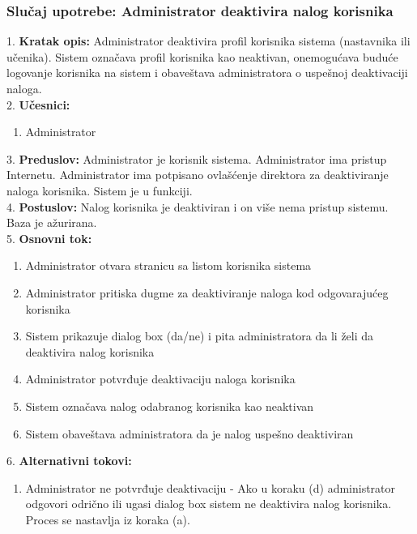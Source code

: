 \documentclass{article}
\begin{document}
\subsubsection{Slučaj upotrebe: Administrator deaktivira nalog korisnika}
1. \textbf{Kratak opis:} Administrator deaktivira profil korisnika sistema (nastavnika ili učenika). Sistem označava profil korisnika kao neaktivan, onemogućava buduće logovanje korisnika na sistem i obaveštava administratora o uspešnoj deaktivaciji naloga. \\

2. \textbf{Učesnici:}
\begin{enumerate} [label=(\alph*)]
\item Administrator
\end{enumerate} 

3. \textbf{Preduslov:} Administrator je korisnik sistema. Administrator ima pristup Internetu. Administrator ima potpisano ovlašćenje direktora za deaktiviranje naloga korisnika. Sistem je u funkciji. \\

4. \textbf{Postuslov:} Nalog korisnika je deaktiviran i on više nema pristup sistemu. Baza je ažurirana. \\

5. \textbf{Osnovni tok:} 
\begin{enumerate} [label=(\alph*)]
\item Administrator otvara stranicu sa listom korisnika sistema
\item Administrator pritiska dugme za deaktiviranje naloga kod odgovarajućeg korisnika
\item Sistem prikazuje dialog box (da/ne) i pita administratora da li želi da deaktivira nalog korisnika
\item Administrator potvrđuje deaktivaciju naloga korisnika
\item Sistem označava nalog odabranog korisnika kao neaktivan
\item Sistem obaveštava administratora da je nalog uspešno deaktiviran
\end{enumerate}

6. \textbf{Alternativni tokovi:}
\begin{enumerate} [label=(\roman*)]
    \item Administrator ne potvrđuje deaktivaciju - Ako u koraku (d) administrator odgovori odrično ili ugasi dialog box sistem ne deaktivira nalog korisnika. Proces se nastavlja iz koraka (a).
\end{enumerate}
\end{document}
